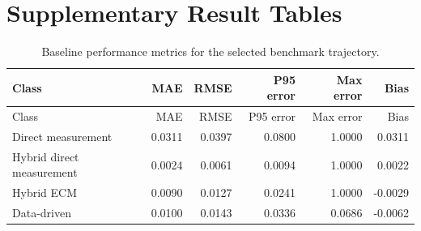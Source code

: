 \documentclass[review]{elsarticle}
\begin{document}
\appendix
\section{Supplementary Result Tables}

\begin{longtable}{lrrrrr}
\caption{Baseline performance metrics for the selected benchmark trajectory.}\label{tab:appendix_baseline_metrics}\\
\toprule
Class & MAE & RMSE & P95 error & Max error & Bias \\
\midrule
\endfirsthead
\toprule
Class & MAE & RMSE & P95 error & Max error & Bias \\
\midrule
\endhead
Direct measurement & 0.0311 & 0.0397 & 0.0800 & 1.0000 & 0.0311 \\
Hybrid direct measurement & 0.0024 & 0.0061 & 0.0094 & 1.0000 & 0.0022 \\
Hybrid ECM & 0.0090 & 0.0127 & 0.0241 & 1.0000 & -0.0029 \\
Data-driven & 0.0100 & 0.0143 & 0.0336 & 0.0686 & -0.0062 \\
\bottomrule
\end{longtable}
\end{document}
